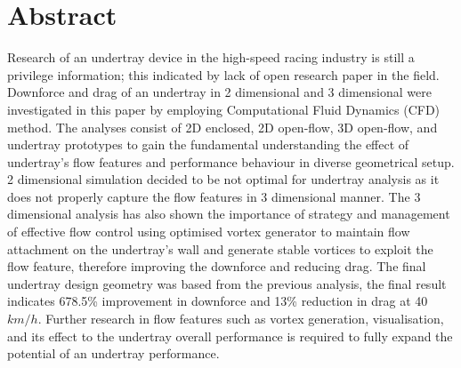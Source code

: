 \newpage
\thispagestyle{empty}
\section*{Abstract} 
\justifying
Research of an undertray device in the high-speed racing industry is still a privilege information; this indicated by lack of open research paper in the field. Downforce and drag of an undertray in 2 dimensional and 3 dimensional were investigated in this paper by employing Computational Fluid Dynamics (CFD) method. The analyses consist of 2D enclosed, 2D open-flow, 3D open-flow, and undertray prototypes to gain the fundamental understanding the effect of undertray's flow features and performance behaviour in diverse geometrical setup. 2 dimensional simulation decided to be not optimal for undertray analysis as it does not properly capture the flow features in 3 dimensional manner. The 3 dimensional analysis has also shown the importance of strategy and management of effective flow control using optimised vortex generator to maintain flow attachment on the undertray's wall and generate stable vortices to exploit the flow feature, therefore improving the downforce and reducing drag. The final undertray design geometry was based from the previous analysis, the final result indicates 678.5\% improvement in downforce and 13\% reduction in drag at 40 $km/h$. Further research in flow features such as vortex generation, visualisation, and its effect to the undertray overall performance is required to fully expand the potential of an undertray performance. 
